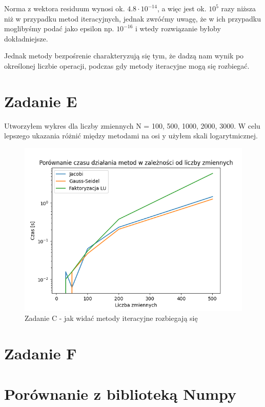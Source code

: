 \documentclass[fleqn]{article}
\begin{document}
    \noindent Norma z wektora residuum wynosi ok. $4.8 \cdot 10^{-14} $, 
    a więc jest ok. $10^5 $ razy niższa niż w przypadku metod iteracyjnych, jednak zwróćmy uwagę,
    że w ich przypadku moglibyśmy podać jako epsilon np. $10^{-16}$ i wtedy rozwiązanie byłoby dokładniejsze.
    
    \noindent Jednak metody bezpośrenie charakteryzują się tym, że dadzą nam wynik po określonej liczbie operacji,
    podczas gdy metody iteracyjne mogą się rozbiegać.
    \newpage
    \section{Zadanie E}
    Utworzyłem wykres dla liczby zmiennych N = {100, 500, 1000, 2000, 3000}.
    W celu lepszego ukazania różnić między metodami na osi y użyłem skali logarytmicznej.


    \begin{figure}[h]

        \centering
        \includegraphics[width=\textwidth]{test.png}
        \centering
        \caption{Zadanie C - jak widać metody iteracyjne rozbiegają się}

    \end{figure}
    \section{Zadanie F}



    \section{Porównanie z biblioteką Numpy}
\end{document}
